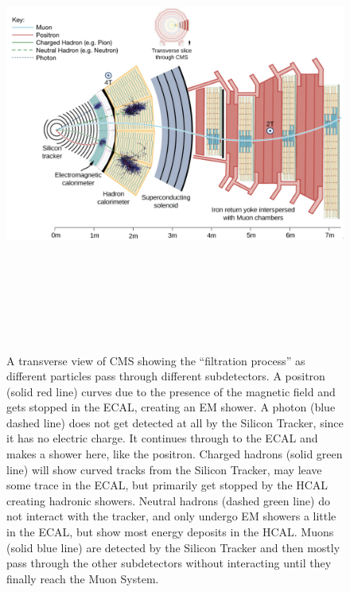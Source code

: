 \begin{figure}[pbth]
\centering
\includegraphics[width=15cm,height=15cm,keepaspectratio]{figures/cms/CMS_transverse_particletrajectories_corrected.png}
    \caption{
    A transverse view of CMS showing the ``filtration process'' as different particles pass through different subdetectors.
    A positron (solid red line) curves due to the presence of the magnetic field and gets stopped in the ECAL, creating an EM shower.
    A photon (blue dashed line) does not get detected at all by the Silicon Tracker, since it has no electric charge.
    It continues through to the ECAL and makes a shower here, like the positron.
    Charged hadrons (solid green line) will show curved tracks from the Silicon Tracker, may leave some trace in the ECAL, but primarily get stopped by the HCAL creating hadronic showers.
    Neutral hadrons (dashed green line) do not interact with the tracker, and only undergo EM showers a little in the ECAL, but show most energy deposits in the HCAL.
    Muons (solid blue line) are detected by the Silicon Tracker and then mostly pass through the other subdetectors without interacting until they finally reach the Muon System.
}
\end{figure}
